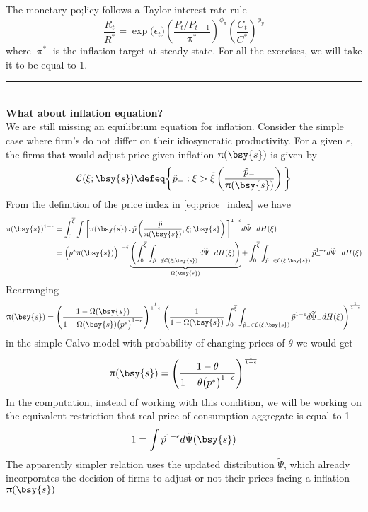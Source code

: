 \documentclass[a4paper,10pt]{article}  %
\begin{document}
The monetary po;licy follows a Taylor interest rate rule
\begin{equation}
   \label{eq:Taylor_rule}
   \frac{R_t}{R^*} = \exp \big( \epsilon_t \big) \left( \frac{P_t/P_{t-1}}{ \uppi^* } \right)^{ \phi_{\pi} } \left( \frac{C_t}{C^*} \right)^{ \phi_{y} } 
\end{equation}
where $ \uppi^* $ is the inflation target at steady-state. For all the exercises, we will take it to be equal to 1. 

\newpage
\rule{\textwidth}{1pt}\\ \small
{\bf\color{OrangeRed} What about inflation equation?} \\
We are still missing an equilibrium equation for inflation. Consider the simple case where firm's do not differ on their
idiosyncratic productivity. For a given $ \epsilon $, the firms that would adjust price given inflation $ \uppi(\bsy{s} ) $
is given by
\[
   \mathcal{C}(\xi; \bsy{s} ) \defeq \bigg\{ \tilde{p}_{-} : \xi > \tilde{\xi} \left( \frac{\tilde{p}_{-}}{\uppi(\bsy{s})} \right) \bigg\}  
\]
From the definition of the price index in \eqref{eq:price_index} we have
\begin{align*}
   \uppi(\bsy{s})^{1-\epsilon} & = 
      \int_0^{ \overline{\xi} } \int 
      \bigg[ \uppi(\bsy{s}) \centerdot \tilde{p}\left( \frac{\tilde{p}_{-}}{ \uppi(\bsy{s})}, \xi; \bsy{s} \right) \bigg]^{1-\epsilon}
      d\tilde{\Psi}_{-} dH(\xi) \\
      & = \Big(p^* \uppi(\bsy{s} ) \Big)^{1- \epsilon} 
      \underbrace{\left( 
         \int_0^{\overline{\xi}} \int_{ \tilde{p}_{-} \not\in \mathcal{C}(\xi;\bsy{s} ) } d\widetilde{\Psi}_{-} dH(\xi)
      \right)}_{ \Omega(\bsy{s}) }
      + \int_0^{\overline{\xi}} \int_{\tilde{p}_{-} \in \mathcal{C}(\xi;\bsy{s} )} \tilde{p}_{-}^{1-\epsilon} d\widetilde{\Psi}_{-} dH(\xi)
\end{align*}
Rearranging 
\[
   \uppi(\bsy{s}) = 
   \left( \frac{1-\Omega(\bsy{s})}{ 1-\Omega(\bsy{s}) \big(p^*\big)^{1-\epsilon} } \right)^{\frac{1}{1-\epsilon}}
   \left( \frac{1}{1-\Omega(\bsy{s})} \int_0^{\overline{\xi}} \int_{\tilde{p}_{-} \in \mathcal{C}(\xi;\bsy{s} )} \tilde{p}_{-}^{1-\epsilon} d\widetilde{\Psi}_{-} dH(\xi) \right)^{\frac{1}{1-\epsilon}}
\]
in the simple Calvo model with probability of changing prices of $ \theta $ we would get
\[
   \uppi(\bsy{s}) = 
   \left( \frac{1-\theta}{ 1-\theta \big(p^*\big)^{1-\epsilon} } \right)^{\frac{1}{1-\epsilon}}
\]
In the computation, instead of working with this condition, we will be working on the equivalent restriction that 
real price of consumption aggregate is equal to 1 
\[
   1 = \int \tilde{p}^{1-\epsilon} d\tilde{\Psi}(\bsy{s})
\]
The apparently simpler relation uses the updated distribution $ \widetilde{\Psi} $, which already incorporates
the decision of firms to adjust or not their prices facing a inflation $ \uppi(\bsy{s}) $ \\
\rule{\textwidth}{1pt}
\normalsize
\end{document}
